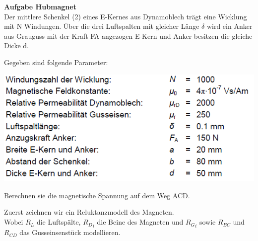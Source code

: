 		\iend
\newpage
		\beginbsp
 		\textbf{Aufgabe Hubmagnet} \\
		Der mittlere Schenkel (2) eines E-Kernes aus Dynamoblech trägt eine Wicklung mit N Windungen. Über
		die drei Luftspalten mit gleicher Länge $\delta$ wird ein Anker aus Grauguss mit der Kraft FA angezogen
		E-Kern und Anker besitzen die gleiche Dicke d. \\
		\begin{center}
		\end{center}
		Gegeben sind folgende Parameter: \\

		\begin{center}
	\includegraphics[scale=0.6]{img/ex5-3.png}
		\end{center}
		Berechnen sie die magnetische Spannung auf dem Weg ACD.
		\iend

\newpage
				\beginbsp
		Zuerst zeichnen wir ein Reluktanzmodell des Magneten. \\
		Wobei $R_L$ die Luftspälte, ${R_D}_i$ die Beine des Magneten und ${R_G}_i$ sowie $R_{BC}$ und $R_{CD}$ das Gusseinsenstück modellieren.


